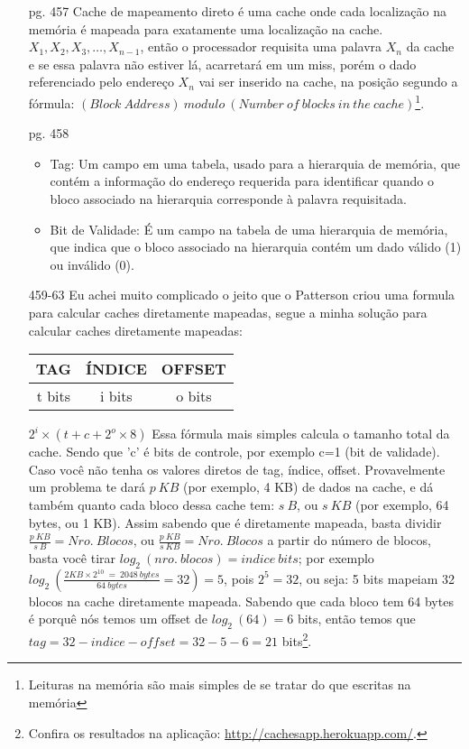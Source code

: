 \documentclass{article}
\begin{document}
\begin{enumerate}
\item[pg. 457] Cache de mapeamento direto é uma cache onde cada localização na 
memória é mapeada para exatamente uma localização na cache. $X_{1}, X_{2}, 
X_{3}, \dots, X_{n-1}$, então o processador requisita uma palavra $X_{n}$ da 
cache e se essa palavra não estiver lá, acarretará em um miss, porém o dado 
referenciado pelo endereço $X_{n}$ vai ser inserido na cache, na posição 
segundo a fórmula: $(Block\ Address)\ modulo\ (Number\ of\ blocks\ in\ the\ 
cache)$\footnote{Leituras na memória são mais simples de se tratar do que 
escritas na memória}.

\item[pg. 458]

\begin{itemize}
\item Tag: Um campo em uma tabela, usado para a hierarquia de memória, que 
contém a informação do endereço requerida para identificar quando o bloco 
associado na hierarquia corresponde à palavra requisitada.

\item Bit de Validade: É um campo na tabela de uma hierarquia de memória, que 
indica que o bloco associado na hierarquia contém um dado válido (1) ou 
inválido (0).
\end{itemize}


\item[459-63] Eu achei muito complicado o jeito que o Patterson criou uma 
formula para calcular caches diretamente mapeadas, segue a minha solução para 
calcular caches diretamente mapeadas:

\begin{table}[h]
  \centering
  \begin{tabular}{|c|c|c|}
    \hline TAG & ÍNDICE & OFFSET \\
    \hline t bits & i bits & o bits \\
    \hline
  \end{tabular}
\end{table}

$2^{i} \times (t + c + 2^{o} \times 8)$ Essa fórmula mais simples calcula o
tamanho total da cache. Sendo que 'c' é bits de controle, por exemplo c=1 (bit
de validade). Caso você não tenha os valores diretos de tag, índice, offset.
Provavelmente um problema te dará $p\ KB$ (por exemplo, 4 KB) de dados na cache,
e dá também quanto cada bloco dessa cache tem: $s\ B$, ou $s\ KB$ (por exemplo, 
64 bytes, ou 1 KB). Assim sabendo que é diretamente mapeada, basta dividir 
$\frac{p\ KB}{s\ B} = Nro.\ Blocos$, ou $\frac{p\ KB}{s\ KB} = Nro.\ Blocos$ a 
partir do número de blocos, basta você tirar $log_{2}\ (nro.\ blocos) = indice\ 
bits$; por exemplo $log_{2}\ (\frac{2 KB \times 2^{10}\ =\ 2048\ bytes}{64\ 
bytes} = 32) = 5$, pois $2^{5} = 32$, ou seja: 5 bits mapeiam 32 blocos na 
cache diretamente mapeada. Sabendo que cada bloco tem 64 bytes é porquê nós 
temos um offset de $log_{2}\ (64) = 6$ bits, então temos que $tag = 32 - indice 
- offset = 32 - 5 - 6 = 21$ bits\footnote{Confira os resultados na aplicação: 
\href{http://cachesapp.herokuapp.com/}{http://cachesapp.herokuapp.com/}.}.


\end{enumerate}
\end{document}
